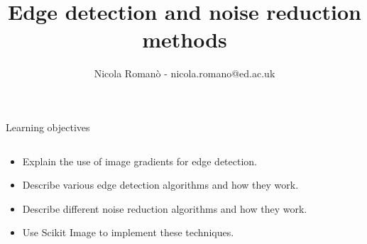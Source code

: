 \documentclass[9pt, aspectratio=169]{beamer}
\author{Nicola Roman\`o - nicola.romano@ed.ac.uk}
\title{Edge detection and noise reduction methods}
\date{}
\begin{document}

\begin{frame}
    \titlepage
\end{frame}

\begin{frame}
    {Learning objectives}
    \begin{columns}
        \begin{column}{0.8\textwidth}
            \begin{itemize}
                \item Explain the use of image gradients for edge detection.
                \item Describe various edge detection algorithms and how they work.
                \item Describe different noise reduction algorithms and how they work.
                \item Use Scikit Image to implement these techniques.
            \end{itemize}
        \end{column}
        \begin{column}{0.2\textwidth}

\end{column}
\end{columns}
\end{frame}
\end{document}

